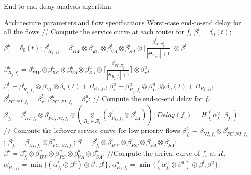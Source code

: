 \documentclass[preprint]{elsarticle}
\begin{document}
\begin{algorithm}
\caption{End-to-end delay analysis algorithm}
\label{alg:equivalentservicecurve}
\begin{algorithmic}[1]
\Require Architecture parameters and flow specifications
\Ensure Worst-case end-to-end delay for all the flows
        \State // Compute the service curve at each router for $f_i$
        \State $\beta_{\tau}^l=\delta_0(t)$;
        \State $\beta_{\tau}^u=\delta_0(t)$;
            \State $\beta_{R_j,f_i}^l=\beta_{BW}^l\otimes\beta_{RC}^l\otimes\beta_{VA}^l\otimes\beta_{SA}^l\otimes\lfloor\frac{\beta_{ST,R_j^{p}}^{l^\prime}}{|\Theta_{R_j,f_i}|+1}\rfloor\otimes\beta_{\tau}^l$;
            \State $\beta_{R_j,f_i}^u=\beta_{BW}^u\otimes\beta_{RC}^u\otimes\beta_{VA}^u\otimes\beta_{SA}^u\otimes\lceil\frac{\beta_{ST,R_j^{p}}^{u^\prime}}{|\Theta_{R_j,f_i}|+1}\rceil\otimes\beta_{\tau}^u$;
            \State $\beta_{\tau}^l=\overline{\beta^l_{R_j,f_i}\otimes\beta_{LT}^l\otimes\delta_\sigma(t)+B_{R_j,f_i}}$;
            \State $\beta_{\tau}^u=\overline{\beta^u_{R_j,f_i}\otimes\beta_{LT}^u\otimes\delta_\sigma(t)+B_{R_j,f_i}}$;
        \EndFor
        \State $\beta_{FC,NI,f_i}^l=\beta^l_{\tau}$;
        \State $\beta_{FC,NI,f_i}^u=\beta^u_{\tau}$;
        \State // Compute the end-to-end delay for $f_i$
        \State $\beta_{f_i}=\beta_{NI,f_i}^l\otimes\beta_{FC,NI,f_i}^l\otimes (\underset{R_k\in\mathcal{R}_{i}}{\otimes}(\beta^l_{R_k,f_i}\otimes\beta^l_{LT}))$;
        \State $Delay(f_i)=H(\alpha^u_{f_i},\beta_{f_i})$;
        \State // Compute the leftover service curve for low-priority flows
        \State $\beta_{f_i}^l=\beta_{NI,f_i}^l\otimes\beta_{FC,NI,f_i}^l$;
        \State $\beta_{f_i}^u=\beta_{NI,f_i}^u\otimes\beta_{FC,NI,f_i}^u$;
                \State $\beta^l=\beta^l_{f_i}\otimes\beta_{BW}^l\otimes\beta_{RC}^l\otimes\beta_{VA}^l\otimes\beta_{SA}^l$;
                \State $\beta^u=\beta^u_{f_i}\otimes\beta_{BW}^u\otimes\beta_{RC}^u\otimes\beta_{VA}^u\otimes\beta_{SA}^u$;
                \State //Compute the arrival curve of $f_i$ at $R_j$
                \State $\alpha^l_{R_j,f_i}=\min\{(\alpha^l_{f_i}\oslash\beta^u)\otimes\beta^l,\beta^l\}$;
                \State $\alpha^u_{R_j,f_i}=\min\{(\alpha^u_{f_i}\otimes\beta^u)\oslash\beta^l,\beta^u\}$;

\end{algorithmic}
\end{algorithm}
\end{document}
